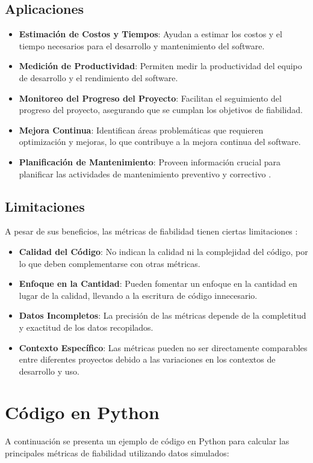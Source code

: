\documentclass[a4,10pt]{article}
\begin{document}
\subsection{Aplicaciones}
\begin{itemize}
    \item \textbf{Estimación de Costos y Tiempos}: Ayudan a estimar los costos y el tiempo necesarios para el desarrollo y mantenimiento del software.
    \item \textbf{Medición de Productividad}: Permiten medir la productividad del equipo de desarrollo y el rendimiento del software.
    \item \textbf{Monitoreo del Progreso del Proyecto}: Facilitan el seguimiento del progreso del proyecto, asegurando que se cumplan los objetivos de fiabilidad.
    \item \textbf{Mejora Continua}: Identifican áreas problemáticas que requieren optimización y mejoras, lo que contribuye a la mejora continua del software.
    \item \textbf{Planificación de Mantenimiento}: Proveen información crucial para planificar las actividades de mantenimiento preventivo y correctivo \cite{javatpoint2022}.
\end{itemize}

\subsection{Limitaciones}
A pesar de sus beneficios, las métricas de fiabilidad tienen ciertas limitaciones \cite{javatpoint2022}:
\begin{itemize}
    \item \textbf{Calidad del Código}: No indican la calidad ni la complejidad del código, por lo que deben complementarse con otras métricas.
    \item \textbf{Enfoque en la Cantidad}: Pueden fomentar un enfoque en la cantidad en lugar de la calidad, llevando a la escritura de código innecesario.
    \item \textbf{Datos Incompletos}: La precisión de las métricas depende de la completitud y exactitud de los datos recopilados.
    \item \textbf{Contexto Específico}: Las métricas pueden no ser directamente comparables entre diferentes proyectos debido a las variaciones en los contextos de desarrollo y uso.
\end{itemize}

\section{Código en Python}
A continuación se presenta un ejemplo de código en Python para calcular las principales métricas de fiabilidad utilizando datos simulados:
\end{document}

